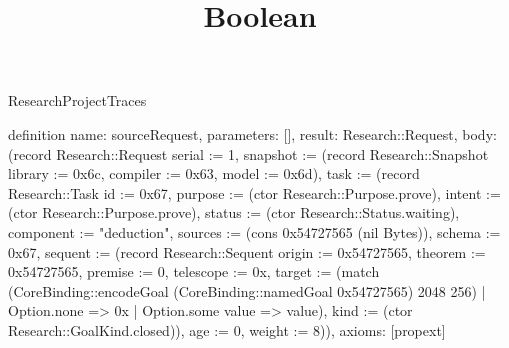 \begin{lexlean}{ResearchProjectTraces}
\title{Boolean}
\begin{semanticmodule}
definition{
 name: sourceRequest,
 parameters: [],
 result: Research::Request,
 body: (record Research::Request {serial := 1, snapshot := (record Research::Snapshot {library := 0x6c, compiler := 0x63, model := 0x6d}), task := (record Research::Task {id := 0x67, purpose := (ctor Research::Purpose.prove), intent := (ctor Research::Purpose.prove), status := (ctor Research::Status.waiting), component := "deduction", sources := (cons 0x54727565 (nil Bytes)), schema := 0x67, sequent := (record Research::Sequent {origin := 0x54727565, theorem := 0x54727565, premise := 0, telescope := 0x, target := (match (CoreBinding::encodeGoal (CoreBinding::namedGoal 0x54727565) 2048 256) | Option.none => 0x | Option.some value => value), kind := (ctor Research::GoalKind.closed)}), age := 0, weight := 8})}),
 axioms: [propext]
}


\end{semanticmodule}
\end{lexlean}
